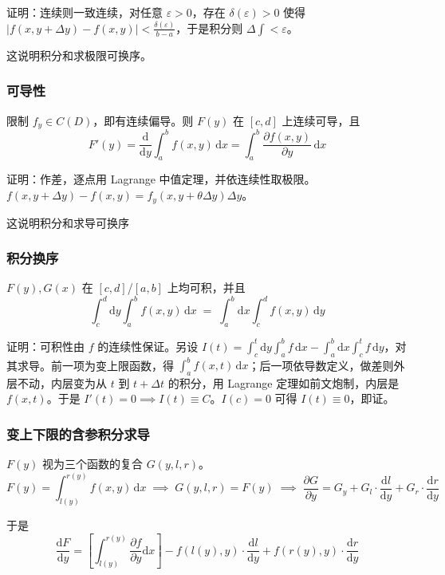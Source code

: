 \documentclass[12pt, a4paper, UTF8, openany]{ctexbook}
\newcommand{\dif}{\mathrm{d}}
\newcommand{\sdif}{\,\dif}
\begin{document}
        证明：连续则一致连续，对任意 $\varepsilon > 0$，存在 $\delta(\varepsilon) > 0$ 使得 $|f(x, y + \Delta y) - f(x, y)| < \frac{\delta(\varepsilon)}{b - a}$，于是积分则 $\Delta \int < \varepsilon$。

        这说明{\heiti 积分和求极限可换序}。

        \subsubsection{可导性}
        限制 $f_y \in C(D)$，即有连续偏导。则 $F(y)$ 在 $[c, d]$ 上连续可导，且
        $$F'(y) = \frac{\dif}{\dif y} \int_{a}^{b} f(x, y)\sdif x = \int_{a}^{b} \frac{\partial f(x, y)}{\partial y} \sdif x$$

        证明：作差，逐点用 Lagrange 中值定理，并依连续性取极限。$f(x, y + \Delta y) - f(x, y) = f_y(x, y + \theta\Delta y)\Delta y$。

        这说明{\heiti 积分和求导可换序}

        \subsubsection{积分换序}
        $F(y), G(x)$ 在 $[c, d]$/$[a, b]$ 上均可积，并且
        $$\int_{c}^{d} \dif y \int_{a}^{b} f(x, y) \sdif x \;=\; \int_{a}^{b} \dif x \int_{c}^{d} f(x, y) \sdif y$$

        证明：可积性由 $f$ 的连续性保证。另设 $I(t) = \int_{c}^{t} \dif y \int_{a}^{b} f \sdif x - \int_{a}^{b} \dif x \int_{c}^{t} f \sdif y$，对其求导。前一项为变上限函数，得 $\int_{a}^{b} f(x, t) \sdif x$；后一项依导数定义，做差则外层不动，内层变为从 $t$ 到 $t + \Delta t$ 的积分，用 Lagrange 定理如前文炮制，内层是 $f(x, t)$。于是 $I'(t) = 0 \implies I(t) \equiv C$。$I(c) = 0$ 可得 $I(t) \equiv 0$，即证。

        \subsubsection{变上下限的含参积分求导}
        $F(y)$ 视为三个函数的复合 $G(y, l, r)$。
        $$F(y) = \int_{l(y)}^{r(y)} f(x, y)\sdif x \; \implies \; G(y, l, r) = F(y) \; \implies \; \frac{\partial G}{\partial y} = G_y + G_l \cdot \frac{\dif l}{\dif y} + G_r \cdot \frac{\dif r}{\dif y}$$

        于是
        $$\frac{\dif F}{\dif y} = \boxed{\left[\int_{l(y)}^{r(y)} \frac{\partial f}{\partial y} \dif x\right] - f\left(l(y), y\right) \cdot \frac{\dif l}{\dif y} + f\left(r(y), y\right) \cdot \frac{\dif r}{\dif y}}$$
\end{document}
